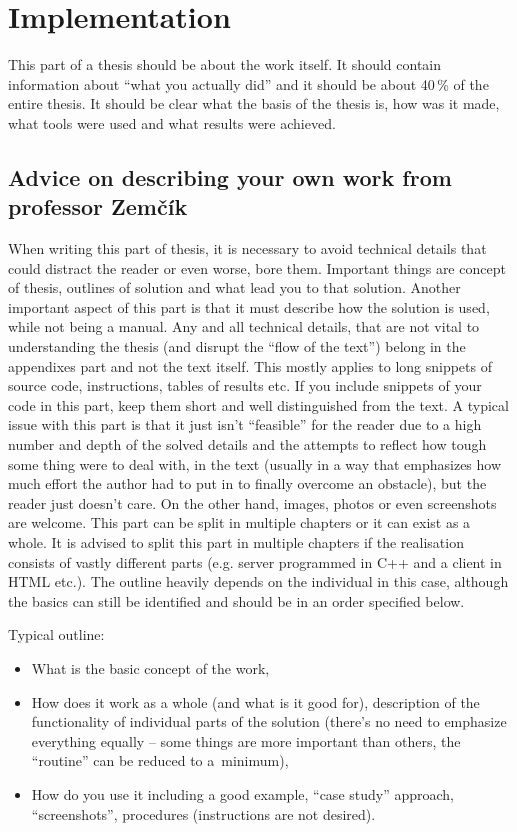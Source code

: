 \section{Implementation}
\label{implementace}

This part of a thesis should be about the work itself. It should contain information about ``what you actually did'' and it should be about 40\,\% of the entire thesis. It should be clear what the basis of the thesis is, how was it made, what tools were used and what results were achieved.

\subsection{Advice on describing your own work from professor Zemčík}

When writing this part of thesis, it is necessary to avoid technical details that could distract the reader or even worse, bore them. Important things are concept of thesis, outlines of solution and what lead you to that solution.
Another important aspect of this part is that it must describe how the solution is used, while not being a manual.
Any and all technical details, that are not vital to understanding the thesis (and disrupt the ``flow of the text'') belong in the appendixes part and not the text itself. This mostly applies to long snippets of source code, instructions, tables of results etc. If you include snippets of your code in this part, keep them short and well distinguished from the text. A typical issue with this part is that it just isn't ``feasible'' for the reader due to a high number and depth of the solved details and the attempts to reflect how tough some thing were to deal with, in the text (usually in a way that emphasizes how much effort the author had to put in to finally overcome an obstacle), but the reader just doesn't care. On the other hand, images, photos or even screenshots are welcome. This part can be split in multiple chapters or it can exist as a whole. It is advised to split this part in multiple chapters if the realisation consists of vastly different parts (e.g. server programmed in C++ and a client in HTML etc.). The outline heavily depends on the individual in this case, although the basics can still be identified and should be in an order specified below.
\bigskip

\begin{samepage}
\noindent Typical outline: 
\begin{itemize}
  \item{What is the basic concept of the work,}
  \item{How does it work as a whole (and what is it good for), description of the functionality of individual parts of the solution (there's no need to emphasize everything equally -- some things are more important than others, the ``routine'' can be reduced to a~minimum),}
  \item{How do you use it including a good example, ``case study'' approach, ``screenshots'', procedures (instructions are not desired).}
\end{itemize}
\end{samepage}


